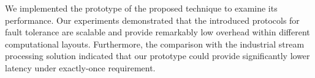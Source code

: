 We implemented the prototype of the proposed technique to examine its performance. Our experiments demonstrated that the introduced protocols for fault tolerance are scalable and provide remarkably low overhead within different computational layouts. Furthermore, the comparison with the industrial stream processing solution indicated that our prototype could provide significantly lower latency under exactly-once requirement.

